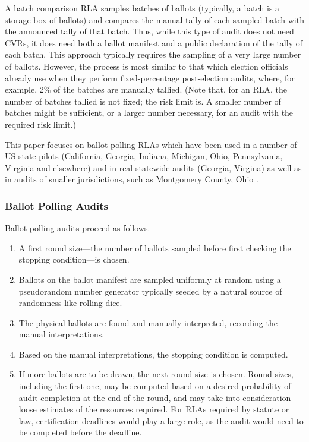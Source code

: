 A batch comparison RLA \cite{RI-report} samples batches of ballots (typically, a batch is a storage box of ballots) and compares the manual tally of each sampled batch with the announced tally of that batch. Thus, while this type of audit does not need CVRs, it does need both a ballot manifest and a public declaration of the tally of each batch. This approach typically requires the sampling of a very large number of ballots. However, the process is most similar to that which election officials already use when they perform fixed-percentage post-election audits, where, for example, 2\% of the batches are manually tallied. (Note that, for an RLA, the number of batches tallied is not fixed; the risk limit is. A smaller number of batches might be sufficient, or a larger number necessary, for an audit with the required risk limit.)

This paper focuses on ballot polling RLAs which have been used in a number of US state pilots (California, Georgia, Indiana, Michigan, Ohio, Pennsylvania, Virginia and elsewhere) and in real statewide audits (Georgia, Virgina) \cite{vv_audits} as well as in audits of smaller jurisdictions, such as Montgomery County, Ohio \cite{usenix_minerva}. 

\subsubsection{Ballot Polling Audits}
Ballot polling audits proceed as follows. 
\begin{enumerate}
\item A first round \cite{usenix_minerva} size---the number of ballots sampled before first checking the stopping condition---is chosen. 
\item Ballots on the ballot manifest are sampled uniformly at random using a pseudorandom number generator typically seeded by a natural source of randomness like rolling dice.
\item The physical ballots are found and manually interpreted, recording the manual interpretations. 
\item Based on the manual interpretations, the stopping condition is computed. 
\item If more ballots are to be drawn, the next round size is chosen. Round sizes, including the first one, may be computed based on a desired probability of audit completion at the end of the round, and may take into consideration loose estimates of the resources required. For RLAs required by statute or law, certification deadlines would play a large role, as the audit would need to be completed before the deadline. 
\end{enumerate} 

